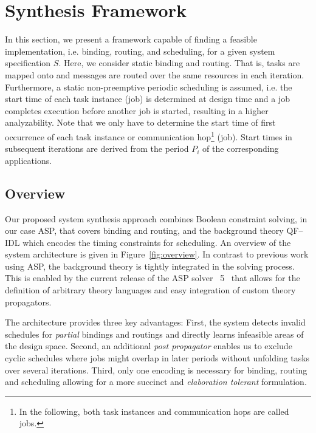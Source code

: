 \section{Synthesis Framework}
\label{sec:synthesis}
In this section, we present a framework capable of finding a feasible implementation, i.e. binding, routing, and scheduling, for a given system specification $S$. Here, we consider static binding and routing. That is, tasks are mapped onto and messages are routed over the same resources in each iteration. Furthermore, a static non-preemptive periodic scheduling is assumed, i.e. the start time of each task instance (job) is determined at design time and a job completes execution before another job is started, resulting in a higher analyzability. Note that we only have to determine the start time of first occurrence of each task instance or communication hop\footnote{In the following, both task instances and communication hops are called jobs.} (job). Start times in subsequent iterations are derived from the period $P_i$ of the corresponding applications.
\vspace*{-2mm}
\subsection{Overview}
Our proposed system synthesis approach combines Boolean constraint solving, in our case ASP, that covers binding and routing, 
and the background theory QF--IDL which encodes the timing constraints for scheduling.
An overview of the system architecture is given in Figure~\ref{fig:overview}.
In contrast to previous work using ASP, the background theory is tightly integrated in the solving process.
This is enabled by the current release of the ASP solver \clingo~5~\cite{gekakaosscwa16a} 
that allows for the definition of arbitrary theory languages and easy integration of custom theory propagators.

The architecture provides three key advantages: 
First, the system detects invalid schedules for \emph{partial} bindings and routings 
and directly learns infeasible areas of the design space.
Second, an additional \emph{post propagator} enables us to exclude cyclic schedules 
where jobs might overlap in later periods
without unfolding tasks over several iterations. 
Third, only one encoding is necessary for binding, routing and scheduling
allowing for a more succinct and \emph{elaboration tolerant} formulation.

